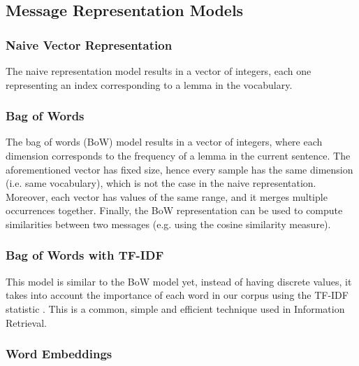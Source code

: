 \documentclass[letterpaper]{article}
\begin{document}
\subsection{Message Representation Models}  \label{Representation}

\subsubsection{Naive Vector Representation}  \label{Naive Vector Representation}

The naive representation model results in a vector of integers, each one representing an index corresponding to a lemma in the vocabulary.

\subsubsection{Bag of Words}  \label{Bag of Words}

The bag of words (BoW) model results in a vector of integers, where each dimension corresponds to the frequency of a lemma in the current sentence. The aforementioned vector has fixed size, hence every sample has the same dimension (i.e. same vocabulary), which is not the case in the naive representation. Moreover, each vector has values of the same range, and it merges multiple occurrences together. Finally, the BoW representation can be used to compute similarities between two messages (e.g. using the cosine similarity measure).

\subsubsection{Bag of Words with TF-IDF}  \label{TFIDF}

This model is similar to the BoW model yet, instead of having discrete values, it takes into account the importance of each word in our corpus using the TF-IDF statistic \cite{salton1988term}. This is a common, simple and efficient technique used in Information Retrieval.

\subsubsection{Word Embeddings}  \label{Word Embeddings}
\end{document}
